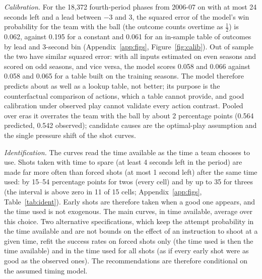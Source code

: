 \documentclass[article]{jdssv}
\begin{document}
\emph{Calibration.} For the 18{,}372 fourth-period phases from 2006-07 on with at most 24 seconds left and a
lead between $-3$ and 3, the squared error of the model's win probability for the team with the ball (the outcome
counts overtime as $\frac12$) is 0.062, against 0.195 for a constant and 0.061 for an in-sample table of outcomes
by lead and 3-second bin (Appendix~\ref{app:figs}, Figure~\ref{fig:calib}). Out of sample the two have similar squared error: with
all inputs estimated on even seasons and scored on odd seasons, and vice versa, the model scores 0.058 and 0.066
against 0.058 and 0.065 for a table built on the training seasons. The model therefore predicts about as well as
a lookup table, not better; its purpose is the counterfactual comparison of actions, which a table cannot
provide, and good calibration under observed play cannot validate every action contrast. Pooled over eras it
overrates the team with the ball by about 2 percentage points (0.564 predicted, 0.542 observed); candidate causes
are the optimal-play assumption and the single pressure shift of the shot curves.

\emph{Identification.} The curves read the time available as the time a team chooses to use. Shots taken with
time to spare (at least 4 seconds left in the period) are made far more often than forced shots (at most 1 second
left) after the same time used: by 15--54 percentage points for twos (every cell) and by up to 35 for threes (the
interval is above zero in 11 of 15 cells; Appendix~\ref{app:figs}, Table~\ref{tab:ident}). Early shots are therefore taken when a good one appears, and
the time used is not exogenous. The main curves, in time available, average over this choice. Two alternative
specifications, which keep the attempt probability in the time available and are not bounds on the effect of an
instruction to shoot at a given time, refit the success rates on forced shots only (the time used is then the time
available) and in the time used for all shots (as if every early shot were as good as the observed ones). The
recommendations are therefore conditional on the assumed timing model.
\end{document}

